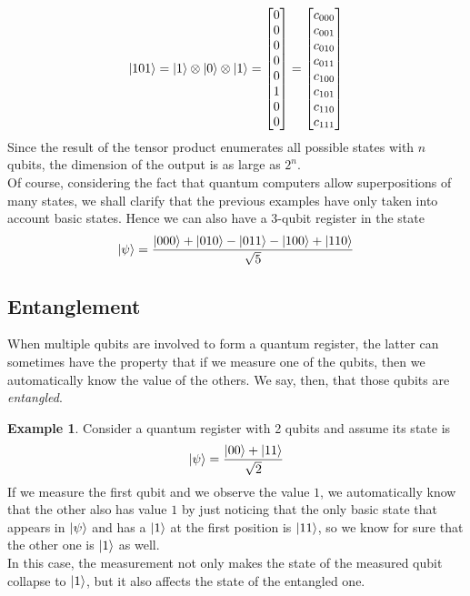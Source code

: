 \documentclass[12pt,a4paper]{report}
\theoremstyle{definition}
\theoremstyle{definition}
\newtheorem{example}{Example}[section]
\theoremstyle{definition}
\begin{document}
\begin{equation*}
    \ket{101}=\ket{1}\otimes\ket{0}\otimes\ket{1}=\begin{bmatrix}
        0\\
        0\\
        0\\
        0\\
        0\\
        1\\
        0\\
        0
    \end{bmatrix}=\begin{bmatrix}
        c_{000}\\
        c_{001}\\
        c_{010}\\
        c_{011}\\
        c_{100}\\
        c_{101}\\
        c_{110}\\
        c_{111}
    \end{bmatrix}
\end{equation*}
Since the result of the tensor product enumerates all possible states with $n$ qubits, the dimension of the output is as large as $2^n$.\\
Of course, considering the fact that quantum computers allow superpositions of many states, we shall clarify that the previous examples have only taken into account basic states. Hence we can also have a 3-qubit register in the state
\begin{equation*}
    \ket{\psi}=\frac{\ket{000}+\ket{010}-\ket{011}-\ket{100}+\ket{110}}{\sqrt{5}}
\end{equation*}



\subsection{Entanglement}
When multiple qubits are involved to form a quantum register, the latter can sometimes have the property that if we measure one of the qubits, then we automatically know the value of the others. We say, then, that those qubits are \textit{entangled}.
\begin{example}
Consider a quantum register with 2 qubits and assume its state is
\begin{equation*}
    \ket{\psi}=\frac{\ket{00}+\ket{11}}{\sqrt{2}}
\end{equation*}
If we measure the first qubit and we observe the value $1$, we automatically know that the other also has value $1$ by just noticing that the only basic state that appears in $\ket{\psi}$ and has a $\ket{1}$ at the first position is $\ket{11}$, so we know for sure that the other one is $\ket{1}$ as well.\\
In this case, the measurement not only makes the state of the measured qubit collapse to $\ket{1}$, but it also affects the state of the entangled one.
\end{example}
\end{document}

